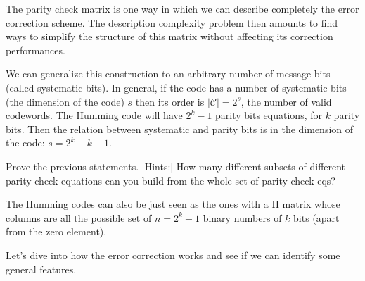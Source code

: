 The parity check matrix is one way in which we can describe completely the error correction scheme. The description complexity problem then amounts to find ways to simplify the structure of this matrix without affecting its correction performances.


We can generalize this construction to an arbitrary number of message bits (called systematic bits). In general, if the code has a number of systematic bits (the dimension of the code) $s$ then its order is $|\mathcal{C}| = 2^{s}$, the number of valid codewords. The Humming code will have $ 2^k -1 $ parity bits equations, for $k$ parity bits. Then the relation between systematic and parity bits is in the dimension of the code: $s = 2^{k} - k - 1$.

\begin{example}
	Prove the previous statements.
	[Hints:] How many different subsets of different parity check equations can you build from the whole set of parity check eqs?
\end{example}

The Humming codes can also be just seen as the ones with a H matrix whose columns are all the possible set of $n = 2^k-1$ binary numbers of $k$ bits (apart from the zero element).


Let's dive into how the error correction works and see if we can identify some general features.

